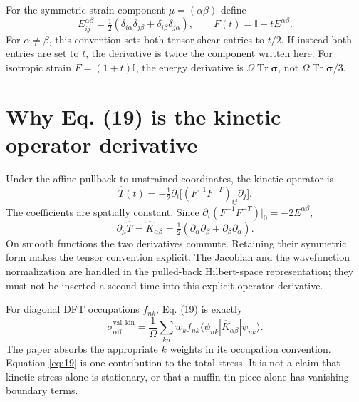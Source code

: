 \documentclass[11pt]{article}
\newcommand{\Tr}{\operatorname{Tr}}
\newcommand{\Id}{\mathbb I}
\begin{document}
For the symmetric strain component $\mu=(\alpha\beta)$ define
\begin{equation}
 E^{\alpha\beta}_{ij}=\tfrac12(\delta_{i\alpha}\delta_{j\beta}+\delta_{i\beta}\delta_{j\alpha}),\qquad F(t)=\Id+t E^{\alpha\beta}.
\end{equation}
For $\alpha\ne\beta$, this convention sets both tensor shear entries to $t/2$. If instead both entries are set to $t$, the derivative is twice the component written here. For isotropic strain $F=(1+t)\Id$, the energy derivative is $\Omega\Tr\bm\sigma$, not $\Omega\Tr\bm\sigma/3$.

\section{Why Eq. (19) is the kinetic operator derivative}
Under the affine pullback to unstrained coordinates, the kinetic operator is
\begin{equation}
 \hat T(t)=-\tfrac12\partial_i\big[(F^{-1}F^{-T})_{ij}\partial_j\big].
\end{equation}
The coefficients are spatially constant. Since $\partial_t(F^{-1}F^{-T})|_0=-2E^{\alpha\beta}$,
\begin{equation}\label{eq:K}
 \boxed{\partial_\mu\hat T=\hat K_{\alpha\beta}
 =\tfrac12(\partial_\alpha\partial_\beta+\partial_\beta\partial_\alpha).}
\end{equation}
On smooth functions the two derivatives commute. Retaining their symmetric form makes the tensor convention explicit. The Jacobian and the wavefunction normalization are handled in the pulled-back Hilbert-space representation; they must not be inserted a second time into this explicit operator derivative.

For diagonal DFT occupations $f_{nk}$, Eq. (19) is exactly
\begin{equation}\label{eq:19}
 \sigma^{\mathrm{val,kin}}_{\alpha\beta}
 =\frac1\Omega\sum_{kn}w_k f_{nk}
 \langle\psi_{nk}|\hat K_{\alpha\beta}|\psi_{nk}\rangle.
\end{equation}
The paper absorbs the appropriate $k$ weights in its occupation convention. Equation \eqref{eq:19} is one contribution to the total stress. It is not a claim that kinetic stress alone is stationary, or that a muffin-tin piece alone has vanishing boundary terms.
\end{document}
